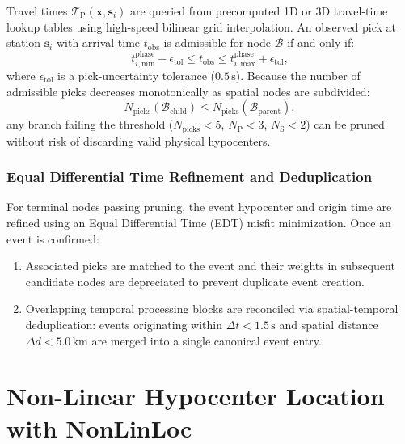 Travel times $\mathcal{T}_{\mathrm{P}}(\mathbf{x}, \mathbf{s}_i)$ are queried from precomputed 1D or 3D travel-time lookup tables using high-speed bilinear grid interpolation. An observed pick at station $\mathbf{s}_i$ with arrival time $t_{\mathrm{obs}}$ is admissible for node $\mathcal{B}$ if and only if:
\begin{equation}
  t_{i, \mathrm{min}}^{\mathrm{phase}} - \epsilon_{\mathrm{tol}} \le t_{\mathrm{obs}} \le t_{i, \mathrm{max}}^{\mathrm{phase}} + \epsilon_{\mathrm{tol}},
\end{equation}
where $\epsilon_{\mathrm{tol}}$ is a pick-uncertainty tolerance ($0.5\,\mathrm{s}$). Because the number of admissible picks decreases monotonically as spatial nodes are subdivided:
\begin{equation}
  N_{\mathrm{picks}}(\mathcal{B}_{\mathrm{child}}) \le N_{\mathrm{picks}}(\mathcal{B}_{\mathrm{parent}}),
\end{equation}
any branch failing the threshold ($N_{\mathrm{picks}} < 5$, $N_{\mathrm{P}} < 3$, $N_{\mathrm{S}} < 2$) can be pruned without risk of discarding valid physical hypocenters.

\subsubsection{Equal Differential Time Refinement and Deduplication}
For terminal nodes passing pruning, the event hypocenter and origin time are refined using an Equal Differential Time (EDT) misfit minimization. Once an event is confirmed:
\begin{enumerate}
  \item Associated picks are matched to the event and their weights in subsequent candidate nodes are depreciated to prevent duplicate event creation.
  \item Overlapping temporal processing blocks are reconciled via spatial-temporal deduplication: events originating within $\Delta t < 1.5\,\mathrm{s}$ and spatial distance $\Delta d < 5.0\,\mathrm{km}$ are merged into a single canonical event entry.
\end{enumerate}

\section{Non-Linear Hypocenter Location with NonLinLoc}
\label{sec:hypocenter_location}

